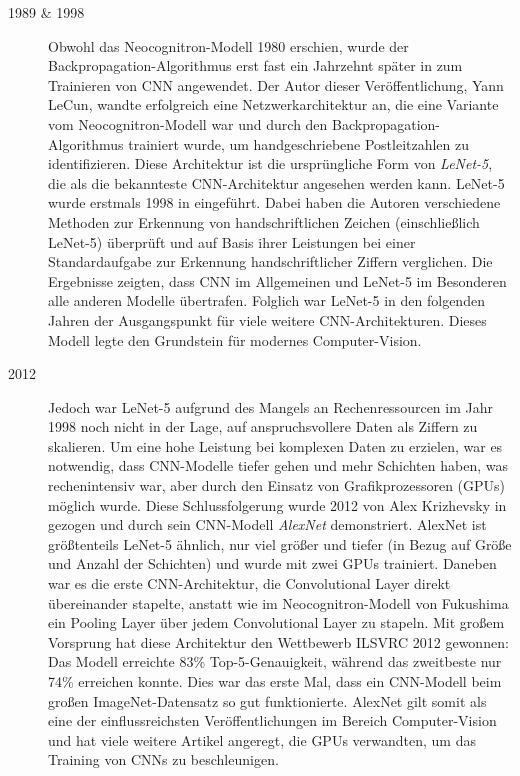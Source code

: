 \begin{description}
	\item[1989 \& 1998]
	
	Obwohl das Neocognitron-Modell 1980 erschien, wurde der Backpropagation-Algorithmus erst fast ein Jahrzehnt später in \cite{yannlecun1989} zum Trainieren von CNN angewendet. Der Autor dieser Veröffentlichung, Yann LeCun, wandte erfolgreich eine Netzwerkarchitektur an, die eine Variante vom Neocognitron-Modell war und durch den Backpropagation-Algorithmus trainiert wurde, um handgeschriebene Postleitzahlen zu identifizieren. Diese Architektur ist die ursprüngliche Form von \emph{LeNet-5}, die als die bekannteste CNN-Architektur angesehen werden kann. LeNet-5 wurde erstmals 1998 in \cite{yannlecun1998} eingeführt. Dabei haben die Autoren verschiedene Methoden zur Erkennung von handschriftlichen Zeichen (einschließlich LeNet-5) überprüft und auf Basis ihrer Leistungen bei einer Standardaufgabe zur Erkennung handschriftlicher Ziffern verglichen. Die Ergebnisse zeigten, dass CNN im Allgemeinen und LeNet-5 im Besonderen alle anderen Modelle übertrafen. Folglich war LeNet-5 in den folgenden Jahren der Ausgangspunkt für viele weitere CNN-Architekturen. Dieses Modell legte den Grundstein für modernes Computer-Vision.
	
	\item[2012]
	
	Jedoch war LeNet-5 aufgrund des Mangels an Rechenressourcen im Jahr 1998 noch nicht in der Lage, auf anspruchsvollere Daten als Ziffern zu skalieren. Um eine hohe Leistung bei komplexen Daten zu erzielen, war es notwendig, dass CNN-Modelle tiefer gehen und mehr Schichten haben, was rechenintensiv war, aber durch den Einsatz von Grafikprozessoren (GPUs) möglich wurde. Diese Schlussfolgerung wurde 2012 von Alex Krizhevsky in \cite{10.1145/3065386} gezogen und durch sein CNN-Modell \emph{AlexNet} demonstriert. AlexNet ist größtenteils LeNet-5 ähnlich, nur viel größer und tiefer (in Bezug auf Größe und Anzahl der Schichten) und wurde mit zwei GPUs trainiert. Daneben war es die erste CNN-Architektur, die Convolutional Layer direkt übereinander stapelte, anstatt wie im Neocognitron-Modell von Fukushima ein Pooling Layer über jedem Convolutional Layer zu stapeln. Mit großem Vorsprung hat diese Architektur den Wettbewerb ILSVRC 2012 gewonnen: Das Modell erreichte 83\% Top-5-Genauigkeit, während das zweitbeste nur 74\% erreichen konnte. Dies war das erste Mal, dass ein CNN-Modell beim großen ImageNet-Datensatz so gut funktionierte. AlexNet gilt somit als eine der einflussreichsten Veröffentlichungen im Bereich Computer-Vision und hat viele weitere Artikel angeregt, die GPUs verwandten, um das Training von CNNs zu beschleunigen.
	
\end{description}

